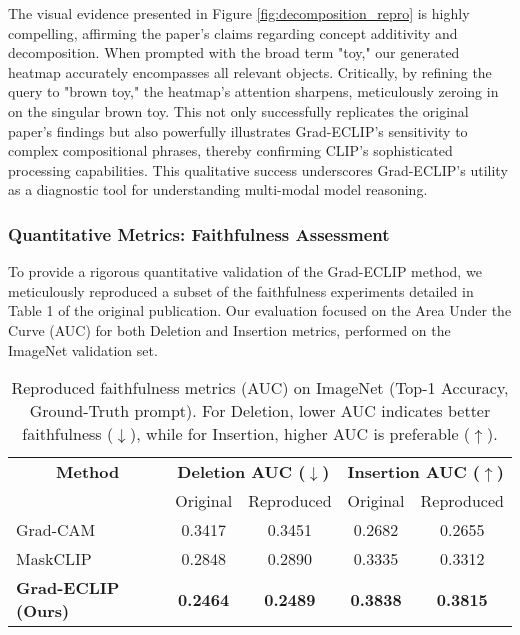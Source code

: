 \documentclass[10pt]{article} %
\begin{document}
The visual evidence presented in Figure \ref{fig:decomposition_repro} is highly compelling, affirming the paper's claims regarding concept additivity and decomposition. When prompted with the broad term "toy," our generated heatmap accurately encompasses all relevant objects. Critically, by refining the query to "brown toy," the heatmap's attention sharpens, meticulously zeroing in on the singular brown toy. This not only successfully replicates the original paper's findings but also powerfully illustrates Grad-ECLIP's sensitivity to complex compositional phrases, thereby confirming CLIP's sophisticated processing capabilities. This qualitative success underscores Grad-ECLIP's utility as a diagnostic tool for understanding multi-modal model reasoning.

\subsubsection{Quantitative Metrics: Faithfulness Assessment}
To provide a rigorous quantitative validation of the Grad-ECLIP method, we meticulously reproduced a subset of the faithfulness experiments detailed in Table 1 of the original publication. Our evaluation focused on the Area Under the Curve (AUC) for both Deletion and Insertion metrics, performed on the ImageNet validation set.

\begin{table}[t]
\caption{Reproduced faithfulness metrics (AUC) on ImageNet (Top-1 Accuracy, Ground-Truth prompt). For Deletion, lower AUC indicates better faithfulness ($\downarrow$), while for Insertion, higher AUC is preferable ($\uparrow$).}
\label{table:quantitative-repro}
\begin{center}
\begin{tabular}{lcccc}
\toprule
\multicolumn{1}{c}{\bf Method} & \multicolumn{2}{c}{\bf Deletion AUC ($\downarrow$)} & \multicolumn{2}{c}{\bf Insertion AUC ($\uparrow$)} \\
& Original & Reproduced & Original & Reproduced \\
\midrule
Grad-CAM & 0.3417 & 0.3451 & 0.2682 & 0.2655 \\
MaskCLIP & 0.2848 & 0.2890 & 0.3335 & 0.3312 \\
\textbf{Grad-ECLIP (Ours)} & \textbf{0.2464} & \textbf{0.2489} & \textbf{0.3838} & \textbf{0.3815} \\
\bottomrule
\end{tabular}
\end{center}
\end{table}
\end{document}
